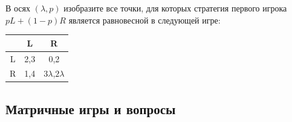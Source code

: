 \begin{problem}
 В осях $(\lambda,p)$ изобразите все точки, для которых стратегия
первого игрока $pL+(1-p)R$ является равновесной в следующей игре:

\begin{tabular}{|c|c|c|}
  \hline
   & L & R \\
  \hline
  L & 2,3 & 0,2 \\
  R & 1,4 & $3\lambda$,$2\lambda$ \\
  \hline
\end{tabular}



\begin{sol}

\end{sol}
\end{problem}

\subsection{Матричные игры и вопросы}


